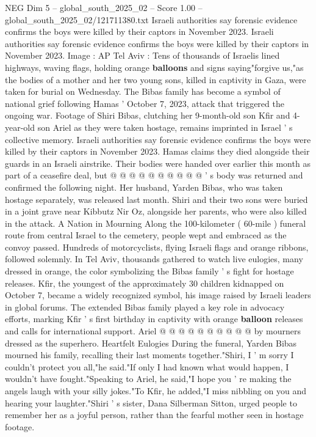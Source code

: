 \begin{textsample}{NEG Dim 5 – global\_south\_2025\_02 – Score 1.00 – global\_south\_2025\_02/121711380.txt}  \label{ex:f5_neg_248}
Israeli authorities say forensic evidence confirms the boys were killed by their captors in November 2023.
Israeli authorities say forensic evidence confirms the boys were killed by their captors in November 2023.
Image : AP Tel Aviv : Tens of thousands of Israelis lined highways, waving flags, holding orange \textbf{balloons} and signs saying"forgive us,"as the bodies of a mother and her two young sons, killed in captivity in Gaza, were taken for burial on Wednesday.
The Bibas family has become a symbol of national grief following Hamas ' October 7, 2023, attack that triggered the ongoing war.
Footage of Shiri Bibas, clutching her 9-month-old son Kfir and 4-year-old son Ariel as they were taken hostage, remains imprinted in Israel ' s collective memory.
Israeli authorities say forensic evidence confirms the boys were killed by their captors in November 2023.
Hamas claims they died alongside their guards in an Israeli airstrike.
Their bodies were handed over earlier this month as part of a ceasefire deal, but @ @ @ @ @ @ @ @ @ @ ' s body was returned and confirmed the following night.
Her husband, Yarden Bibas, who was taken hostage separately, was released last month.
Shiri and their two sons were buried in a joint grave near Kibbutz Nir Oz, alongside her parents, who were also killed in the attack.
A Nation in Mourning Along the 100-kilometer ( 60-mile ) funeral route from central Israel to the cemetery, people wept and embraced as the convoy passed.
Hundreds of motorcyclists, flying Israeli flags and orange ribbons, followed solemnly.
In Tel Aviv, thousands gathered to watch live eulogies, many dressed in orange, the color symbolizing the Bibas family ' s fight for hostage releases.
Kfir, the youngest of the approximately 30 children kidnapped on October 7, became a widely recognized symbol, his image raised by Israeli leaders in global forums.
The extended Bibas family played a key role in advocacy efforts, marking Kfir ' s first birthday in captivity with orange \textbf{balloon} releases and calls for international support.
Ariel @ @ @ @ @ @ @ @ @ @ by mourners dressed as the superhero.
Heartfelt Eulogies During the funeral, Yarden Bibas mourned his family, recalling their last moments together."Shiri, I ' m sorry I couldn't protect you all,"he said."If only I had known what would happen, I wouldn't have fought."Speaking to Ariel, he said,"I hope you ' re making the angels laugh with your silly jokes."To Kfir, he added,"I miss nibbling on you and hearing your laughter."Shiri ' s sister, Dana Silberman Sitton, urged people to remember her as a joyful person, rather than the fearful mother seen in hostage footage.

\end{textsample}
